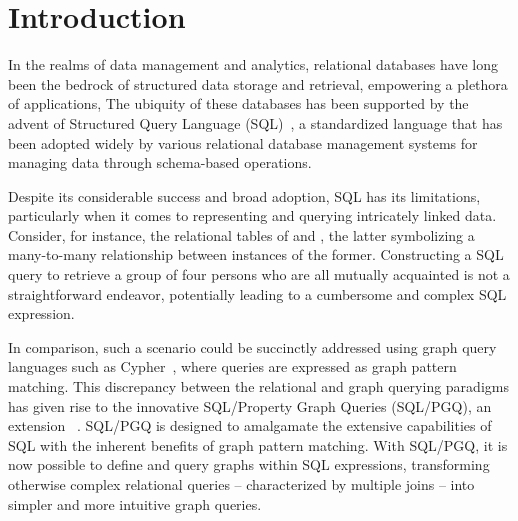 \section{Introduction}
\label{sec:introduction}

In the realms of data management and analytics, relational databases have long been the bedrock of structured data storage and retrieval, empowering a plethora of applications,%
The ubiquity of these databases has been supported by the advent of Structured Query Language (SQL)~\cite{chamberlin1974sequel}, a standardized language that has been adopted widely by various relational database management systems for managing data through schema-based operations. %

Despite its considerable success and broad adoption, SQL has its limitations, particularly when it comes to representing and querying intricately linked data. Consider, for instance, the relational tables of  and , the latter symbolizing a many-to-many relationship between instances of the former. Constructing a SQL query to retrieve a group of four persons who are all mutually acquainted is not a straightforward endeavor, potentially leading to a cumbersome and complex SQL expression.

In comparison, such a scenario could be succinctly addressed using graph query languages such as Cypher~\cite{opencypher}, where queries are expressed as graph pattern matching. This discrepancy between the relational and graph querying paradigms has given rise to the innovative SQL/Property Graph Queries (SQL/PGQ), an extension ~\cite{sql-pgq}. SQL/PGQ is designed to amalgamate the extensive capabilities of SQL with the inherent benefits of graph pattern matching. With SQL/PGQ, it is now possible to define and query graphs within SQL expressions, transforming otherwise complex relational queries -- characterized by multiple joins -- into simpler and more intuitive graph queries.


